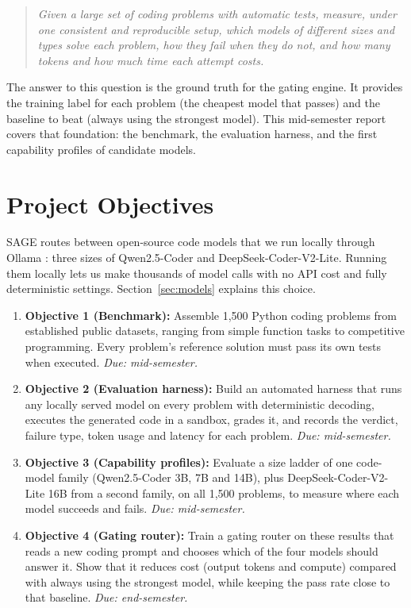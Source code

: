 \begin{quote}
\itshape Given a large set of coding problems with automatic tests, measure, under one consistent and reproducible setup, which models of different sizes and types solve each problem, how they fail when they do not, and how many tokens and how much time each attempt costs.
\end{quote}

The answer to this question is the ground truth for the gating engine. It provides the training label for each problem (the cheapest model that passes) and the baseline to beat (always using the strongest model). This mid-semester report covers that foundation: the benchmark, the evaluation harness, and the first capability profiles of candidate models.

\section{Project Objectives}

SAGE routes between open-source code models that we run locally through Ollama \cite{ollama}: three sizes of Qwen2.5-Coder and DeepSeek-Coder-V2-Lite. Running them locally lets us make thousands of model calls with no API cost and fully deterministic settings. Section~\ref{sec:models} explains this choice.

\begin{enumerate}[label=\arabic*.,leftmargin=*]
  \item \textbf{Objective 1 (Benchmark):} Assemble 1,500 Python coding problems from established public datasets, ranging from simple function tasks to competitive programming. Every problem's reference solution must pass its own tests when executed. \emph{Due: mid-semester.}
  \item \textbf{Objective 2 (Evaluation harness):} Build an automated harness that runs any locally served model on every problem with deterministic decoding, executes the generated code in a sandbox, grades it, and records the verdict, failure type, token usage and latency for each problem. \emph{Due: mid-semester.}
  \item \textbf{Objective 3 (Capability profiles):} Evaluate a size ladder of one code-model family (Qwen2.5-Coder 3B, 7B and 14B), plus DeepSeek-Coder-V2-Lite 16B from a second family, on all 1,500 problems, to measure where each model succeeds and fails. \emph{Due: mid-semester.}
  \item \textbf{Objective 4 (Gating router):} Train a gating router on these results that reads a new coding prompt and chooses which of the four models should answer it. Show that it reduces cost (output tokens and compute) compared with always using the strongest model, while keeping the pass rate close to that baseline. \emph{Due: end-semester.}
\end{enumerate}

